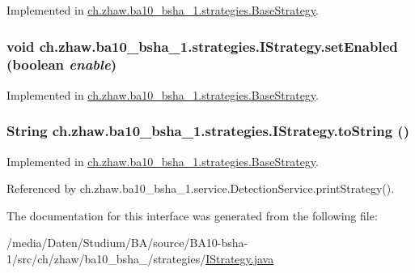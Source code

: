 Implemented in \hyperlink{classch_1_1zhaw_1_1ba10__bsha__1_1_1strategies_1_1BaseStrategy_ad1b20c8f3f41126c9e6cef52d3f30bbe}{ch.zhaw.ba10\_\-bsha\_\-1.strategies.BaseStrategy}.\hypertarget{interfacech_1_1zhaw_1_1ba10__bsha__1_1_1strategies_1_1IStrategy_ae95d5ca1a67248a3c6dd80b40d6f6a32}{
\subsubsection[{setEnabled}]{\setlength{\rightskip}{0pt plus 5cm}void ch.zhaw.ba10\_\-bsha\_\-1.strategies.IStrategy.setEnabled (boolean {\em enable})}}
\label{interfacech_1_1zhaw_1_1ba10__bsha__1_1_1strategies_1_1IStrategy_ae95d5ca1a67248a3c6dd80b40d6f6a32}


Implemented in \hyperlink{classch_1_1zhaw_1_1ba10__bsha__1_1_1strategies_1_1BaseStrategy_acfeb454c9eda3e3279c75ce8101d980c}{ch.zhaw.ba10\_\-bsha\_\-1.strategies.BaseStrategy}.\hypertarget{interfacech_1_1zhaw_1_1ba10__bsha__1_1_1strategies_1_1IStrategy_a2b109250e12270545e1c342c9d136bcd}{
\subsubsection[{toString}]{\setlength{\rightskip}{0pt plus 5cm}String ch.zhaw.ba10\_\-bsha\_\-1.strategies.IStrategy.toString ()}}
\label{interfacech_1_1zhaw_1_1ba10__bsha__1_1_1strategies_1_1IStrategy_a2b109250e12270545e1c342c9d136bcd}


Implemented in \hyperlink{classch_1_1zhaw_1_1ba10__bsha__1_1_1strategies_1_1BaseStrategy_adfb24fbd69261e8567269c5d59365e46}{ch.zhaw.ba10\_\-bsha\_\-1.strategies.BaseStrategy}.

Referenced by ch.zhaw.ba10\_\-bsha\_\-1.service.DetectionService.printStrategy().

The documentation for this interface was generated from the following file:\begin{DoxyCompactItemize}
\item 
/media/Daten/Studium/BA/source/BA10-\/bsha-\/1/src/ch/zhaw/ba10\_\-bsha\_/strategies/\hyperlink{IStrategy_8java}{IStrategy.java}\end{DoxyCompactItemize}
